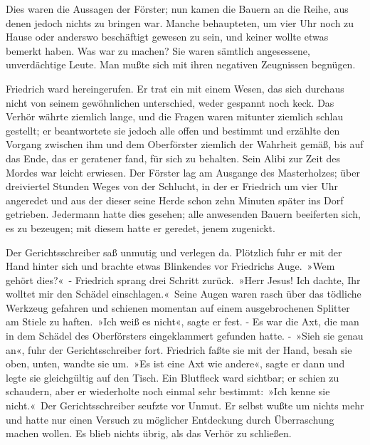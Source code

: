Dies waren die Aussagen der Förster; nun kamen die Bauern an die Reihe, aus denen jedoch nichts zu bringen war. Manche behaupteten, um vier Uhr noch zu Hause oder anderswo beschäftigt gewesen zu sein, und keiner wollte etwas bemerkt haben. Was war zu machen? Sie waren sämtlich angesessene, unverdächtige Leute. Man mußte sich mit ihren negativen Zeugnissen begnügen.

Friedrich ward hereingerufen. Er trat ein mit einem Wesen, das sich durchaus nicht von seinem gewöhnlichen unterschied, weder gespannt noch keck. Das Verhör währte ziemlich lange, und die Fragen waren mitunter ziemlich schlau gestellt; er beantwortete sie jedoch alle offen und bestimmt und erzählte den Vorgang zwischen ihm und dem Oberförster ziemlich der Wahrheit gemäß, bis auf das Ende, das er geratener fand, für sich zu behalten. Sein Alibi zur Zeit des Mordes war leicht erwiesen. Der Förster lag am Ausgange des Masterholzes; über dreiviertel Stunden Weges von der Schlucht, in der er Friedrich um vier Uhr angeredet und aus der dieser seine Herde schon zehn Minuten später ins Dorf getrieben. Jedermann hatte dies gesehen; alle anwesenden Bauern beeiferten sich, es zu bezeugen; mit diesem hatte er geredet, jenem zugenickt.

Der Gerichtsschreiber saß unmutig und verlegen da. Plötzlich fuhr er mit der Hand hinter sich und brachte etwas Blinkendes vor Friedrichs Auge. »Wem gehört dies?« - Friedrich sprang drei Schritt zurück. »Herr Jesus! Ich dachte, Ihr wolltet mir den Schädel einschlagen.« Seine Augen waren rasch über das tödliche Werkzeug gefahren und schienen momentan auf einem ausgebrochenen Splitter am Stiele zu haften. »Ich weiß es nicht«, sagte er fest. - Es war die Axt, die man in dem Schädel des Oberförsters eingeklammert gefunden hatte. - »Sieh sie genau an«, fuhr der Gerichtsschreiber fort. Friedrich faßte sie mit der Hand, besah sie oben, unten, wandte sie um. »Es ist eine Axt wie andere«, sagte er dann und legte sie gleichgültig auf den Tisch. Ein Blutfleck ward sichtbar; er schien zu schaudern, aber er wiederholte noch einmal sehr bestimmt: »Ich kenne sie nicht.« Der Gerichtsschreiber seufzte vor Unmut. Er selbst wußte um nichts mehr und hatte nur einen Versuch zu möglicher Entdeckung durch Überraschung machen wollen. Es blieb nichts übrig, als das Verhör zu schließen.


